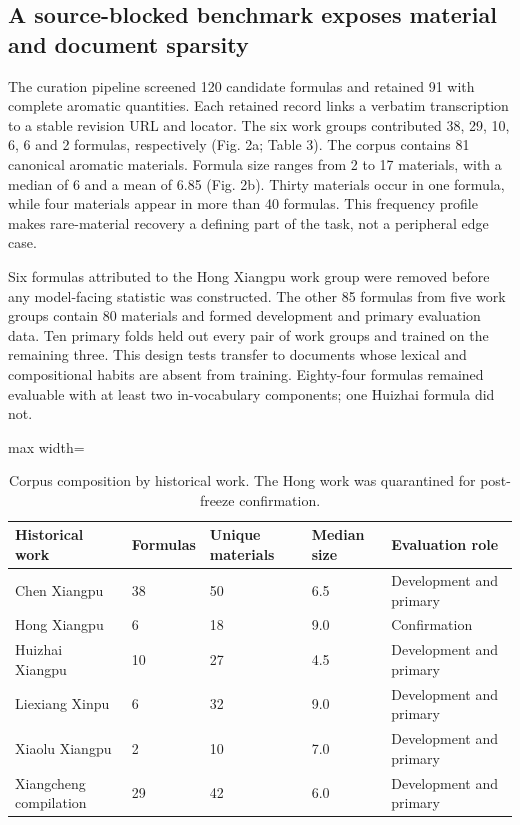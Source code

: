 \documentclass[11pt]{article}
\begin{document}
\subsection{A source-blocked benchmark exposes material and document sparsity}

The curation pipeline screened 120 candidate formulas and retained 91 with complete aromatic quantities. Each retained record links a verbatim transcription to a stable revision URL and locator. The six work groups contributed 38, 29, 10, 6, 6 and 2 formulas, respectively (Fig. 2a; Table 3). The corpus contains 81 canonical aromatic materials. Formula size ranges from 2 to 17 materials, with a median of 6 and a mean of 6.85 (Fig. 2b). Thirty materials occur in one formula, while four materials appear in more than 40 formulas. This frequency profile makes rare-material recovery a defining part of the task, not a peripheral edge case.

Six formulas attributed to the Hong Xiangpu work group were removed before any model-facing statistic was constructed. The other 85 formulas from five work groups contain 80 materials and formed development and primary evaluation data. Ten primary folds held out every pair of work groups and trained on the remaining three. This design tests transfer to documents whose lexical and compositional habits are absent from training. Eighty-four formulas remained evaluable with at least two in-vocabulary components; one Huizhai formula did not.

\begin{table}[htbp]
\centering
\small
\caption{Corpus composition by historical work. The Hong work was quarantined for post-freeze confirmation.}
\label{tab:3}
\begin{adjustbox}{max width=\linewidth}
\begin{tabular}{@{}lllll@{}}
\toprule
\textbf{Historical work} & \textbf{Formulas} & \textbf{Unique materials} & \textbf{Median size} & \textbf{Evaluation role} \\
\midrule
Chen Xiangpu & 38 & 50 & 6.5 & Development and primary \\
Hong Xiangpu & 6 & 18 & 9.0 & Confirmation \\
Huizhai Xiangpu & 10 & 27 & 4.5 & Development and primary \\
Liexiang Xinpu & 6 & 32 & 9.0 & Development and primary \\
Xiaolu Xiangpu & 2 & 10 & 7.0 & Development and primary \\
Xiangcheng compilation & 29 & 42 & 6.0 & Development and primary \\
\bottomrule
\end{tabular}
\end{adjustbox}
\end{table}
\end{document}
